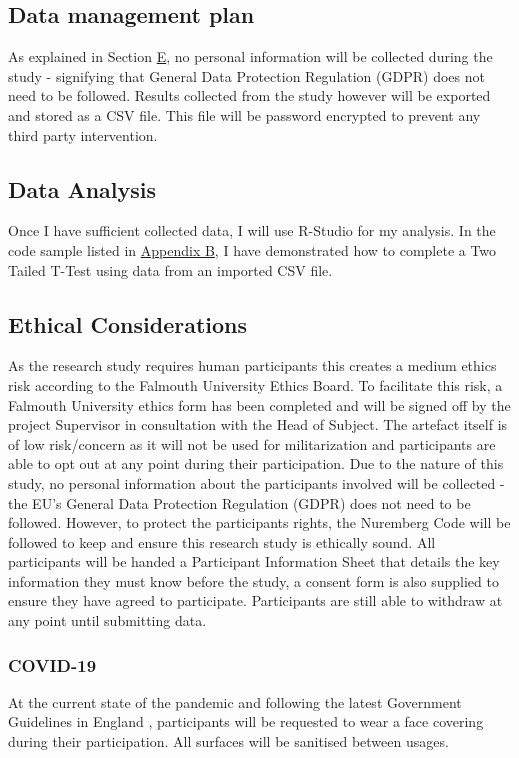 \subsection{Data management plan}
As explained in Section \hyperref[ethics]{E}, no personal information will be collected during the study - signifying that General Data Protection Regulation (GDPR) \cite{gdpr} does not need to be followed. Results collected from the study however will be exported and stored as a CSV file. This file will be password encrypted to prevent any third party intervention.

\subsection{Data Analysis}
Once I have sufficient collected data, I will use R-Studio for my analysis. In the code sample listed in \hyperref[append:b]{Appendix B}, I have demonstrated how to complete a Two Tailed T-Test using data from an imported CSV file.

\subsection{Ethical Considerations}\label{ethics}
As the research study requires human participants this creates a medium ethics risk according to the Falmouth University Ethics Board. To facilitate this risk, a Falmouth University ethics form has been completed and will be signed off by the project Supervisor in consultation with the Head of Subject. The artefact itself is of low risk/concern as it will not be used for militarization and participants are able to opt out at any point during their participation.
Due to the nature of this study, no personal information about the participants involved will be collected - the EU's General Data Protection Regulation (GDPR)\cite{gdpr} does not need to be followed. However, to protect the participants rights, the Nuremberg Code will be followed to keep and ensure this research study is ethically sound\cite{nuremberg-code}. All participants will be handed a Participant Information Sheet that details the key information they must know before the study, a consent form is also supplied to ensure they have agreed to participate. Participants are still able to withdraw at any point until submitting data.
\subsubsection*{COVID-19}
At the current state of the pandemic and following the latest Government Guidelines in England \cite{gov-guidlines}, participants will be requested to wear a face covering during their participation. All surfaces will be sanitised between usages.